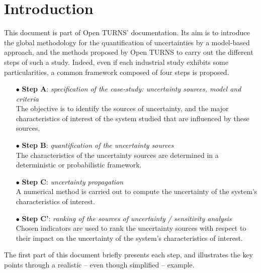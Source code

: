 \section{Introduction}

This document is part of Open TURNS' documentation. Its aim is to introduce the global methodology for the quantification of uncertainties by a model-based approach, and the methods proposed by Open TURNS to carry out the different steps of such a study. Indeed, even if each industrial study exhibits some particularities, a common framework composed of four steps is proposed.

\begin{itemize}

\item[$\bullet$] {\bf Step A}: {\em specification of the case-study: uncertainty sources, model and criteria} \\
  The objective is to identify the sources of uncertainty, and the major characteristics of interest of the system studied that are influenced by these sources.
\item[$\bullet$] {\bf Step B}: {\em quantification of the uncertainty sources } \\
  The characteristics of the uncertainty sources are determined in a deterministic or probabilistic framework.
\item[$\bullet$] {\bf Step C}: {\em uncertainty propagation} \\
  A numerical method is carried out to compute the uncertainty of the system's characteristics of interest.
\item[$\bullet$] {\bf Step C'}: {\em ranking of the sources of uncertainty / sensitivity analysis} \\
  Chosen indicators are used to rank the uncertainty sources with respect to their impact on the uncertainty of the system's characteristics of interest.

\end{itemize} \vspace{2mm}

The first part of this document briefly presents each step, and illustrates the key points through a realistic -- even though simplified -- example.

